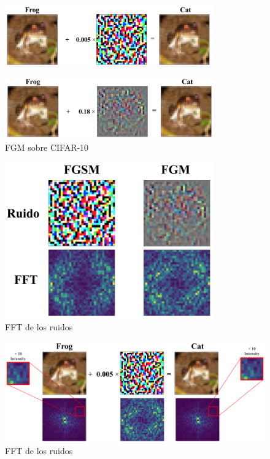 \begin{figure}[h!]
    \centering
    \includegraphics[width=0.80\textwidth]{images/cifar-10/frog_cat_fgsm.png}
    \label{frog_cat_fgsm}
\end{figure}

\begin{figure}[h!]
    \centering
    \includegraphics[width=0.81\textwidth]{images/cifar-10/frog_cat_fgm.png}
    \caption{FGM sobre CIFAR-10}
    \label{frog_cat_fgm}
\end{figure}

\begin{figure}[h!]
    \centering
    \includegraphics[width=0.8\textwidth]{images/cifar-10/frog_noises.png}
    \caption{FFT de los ruidos}
    \label{frog_ruidos}
\end{figure}


\begin{figure}[h!]
    \centering
    \includegraphics[width=\textwidth]{images/cifar-10/frog_cat_fgsm_fft.png}
    \caption{FFT de los ruidos}
    \label{frog_cat_fft}
\end{figure}




